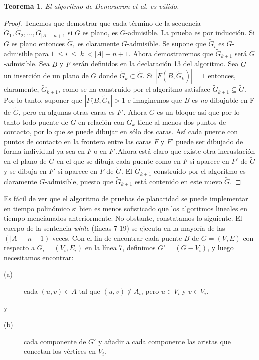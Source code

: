 \documentclass[10pt,a5paper]{book}
\newtheorem{teorema}{Teorema}[chapter]
\begin{document}
\begin{teorema}
El algoritmo de Demoucron \emph{et al.} es válido.
\end{teorema}
\begin{proof}
Tenemos que demostrar que cada término de la secuencia $\widetilde{G}_1, \widetilde{G}_2, \ldots, \widetilde{G}_{|A|-n+1}$ si $G$ es plano, es $G$-admisible. La prueba es por inducción. Si $G$ es plano entonces $\widetilde{G}_1$ es claramente $G$-admisible. Se supone que $\widetilde{G}_i$ es $G$-admisible para $1\ \le i\ \le\ k\ < |A| -n +1$. Ahora demostraremos que $\widetilde{G}_{k+1}$ será $G$-admisible. Sea $B$ y $F$ serán definidos en la declaración 13 del algoritmo. Sea $\widetilde{G}$ un inserción de un plano de $G$ donde $\widetilde{G}_k \subset \widetilde{G}$. Si $|F(B,\widetilde{G}_k)| = 1$ entonces, claramente, $\widetilde{G}_{k+1}$, como se ha construido por el algoritmo satisface $\widetilde{G}_{k+1} \subseteq \widetilde{G}$. Por lo tanto, suponer que $|F(B,\widetilde{G}_k| > 1$ e imaginemos que $B$ es \emph{no} dibujable en F de $\widetilde{G}$, pero en algunas otras caras es $F'$. Ahora $G$ es un bloque así que por lo tanto todo puente de $G$ en relación con $G_k$ tiene al menos dos puntos de contacto, por lo que se puede dibujar en sólo dos caras. Así cada puente con puntos de contacto en la frontera entre las caras $F$ y $F'$ puede ser dibujado de forma individual ya sea en $F$ o en $F'$.Ahora está claro que existe otra incrustación en el plano de $G$ en el que se dibuja cada puente como en $F$ si aparece en $F'$ de $\widetilde{G}$ y se dibuja en $F'$ si aparece en $F$ de $\widetilde{G}$. El $\widetilde{G}_{k+1}$ construido por el algoritmo es claramente $G$-admisible, puesto que $\widetilde{G}_{k+1}$ está contenido en este nuevo $\widetilde{G}$.
\end{proof}

Es fácil de ver que el algoritmo de pruebas de planaridad se puede implementar en tiempo polinómico si bien es menos sofisticado que los algoritmos lineales en tiempo mencianados anteriormente. No obstante, constatamos lo siguiente. El cuerpo de la sentencia \emph{while} (líneas 7-19) se ejecuta en la mayoría de las $(|A| -n+1)$ veces. Con el fin de encontrar cada puente $B$ de $G = (V,E)$ con respecto a $G_i = (V_i,E_i)$ en la línea 7, definimos $G' = (G-V_i)$, y luego necesitamos encontrar:
\begin{description}
\item[(a)] cada $(u,v) \in A$ tal que $(u,v) \notin A_i$, pero $u \in V_i$ y $v \in V_i$.
\end{description}
y
\begin{description}
\item[(b)] cada componente de $G'$ y añadir a cada componente las aristas que conectan los vértices en $V_i$. 
\end{description}
\end{document}
